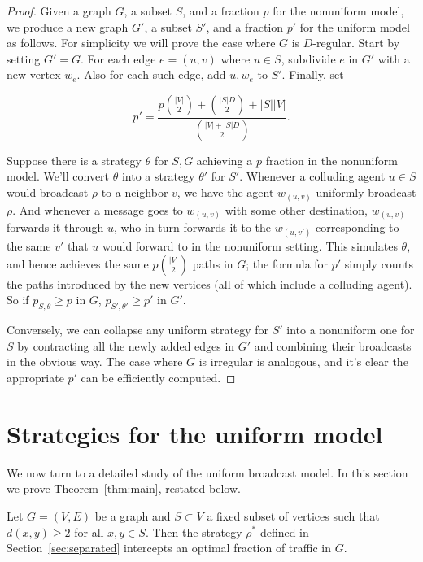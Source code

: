 \documentclass[prodmode,acmec]{ec-acmsmall}
\begin{document}
\begin{proof}

Given a graph $G$, a subset $S$, and a fraction $p$ for the nonuniform model,
we produce a new graph $G'$, a subset $S'$, and a fraction $p'$ for the uniform
model as follows. For simplicity we will prove the case where $G$ is
$D$-regular. Start by setting $G' = G$. For each edge $e = (u,v)$ where $u \in
S$, subdivide $e$ in $G'$ with a new vertex $w_e$. Also for each such edge, add
$u, w_e$ to $S'$.  Finally, set 

\[ 
   p' = \frac{p\binom{|V|}{2} + \binom{|S|D}{2} + |S||V|}{\binom{|V| +
   |S|D}{2}}.
\]

Suppose there is a strategy $\theta$ for $S,G$ achieving a $p$ fraction in the
nonuniform model. We'll convert $\theta$ into a strategy $\theta'$ for $S'$.
Whenever a colluding agent $u \in S$ would broadcast $\rho$ to a neighbor $v$,
we have the agent $w_{(u,v)}$ uniformly broadcast $\rho$.  And whenever a
message goes to $w_{(u,v)}$ with some other destination, $w_{(u,v)}$ forwards
it through $u$, who in turn forwards it to the $w_{(u,v')}$ corresponding to
the same $v'$ that $u$ would forward to in the nonuniform setting. This
simulates $\theta$, and hence achieves the same $p\binom{|V|}{2}$ paths in $G$;
the formula for $p'$ simply counts the paths introduced by the new vertices
(all of which include a colluding agent). So if $p_{S,\theta} \geq p$ in $G$,
$p_{S', \theta'} \geq p'$ in $G'$.

Conversely, we can collapse any uniform strategy for $S'$ into a nonuniform one
for $S$ by contracting all the newly added edges in $G'$ and combining their
broadcasts in the obvious way. The case where $G$ is irregular is analogous,
and it's clear the appropriate $p'$ can be efficiently computed.
\end{proof}

\section{Strategies for the uniform model} \label{sec:strategies}

We now turn to a detailed study of the uniform broadcast model. In this section
we prove Theorem~\ref{thm:main}, restated below.

\begin{theorem} \label{thm:optimal-separated}

Let $G = (V,E)$ be a graph and $S \subset V$ a fixed subset of vertices such
that $d(x, y) \geq 2$ for all $x,y \in S$. Then the strategy $\rho^*$ defined
in Section~\ref{sec:separated} intercepts an optimal fraction of traffic in
$G$.

\end{theorem}
\end{document}
